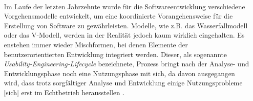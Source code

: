\\
Im Laufe der letzten Jahrzehnte wurde für die Softwareentwicklung verschiedene Vorgehensmodelle entwickelt, um eine koordinierte Vorangehensweise für die Erstellung von Software zu gewährleisten. Modelle, wie z.B. das Wasserfallmodell oder das V-Modell, werden in der Realität jedoch kaum wirklich eingehalten. Es enstehen immer wieder Mischformen, bei denen Elemente der benutzerorientierten Entwicklung integriert werden. Dieser, als sogenannte \textit{Usability-Engineering-Lifecycle} bezeichnete, Prozess bringt nach der Analyse- und Entwicklungsphase noch eine Nutzungsphase mit sich, da davon ausgegangen wird, dass \glqq trotz sorgfältiger Analyse und Entwicklung einige Nutzungsprobleme [sich] erst im Echtbetrieb herausstellen\grqq{} \cite{lifecycle}.





